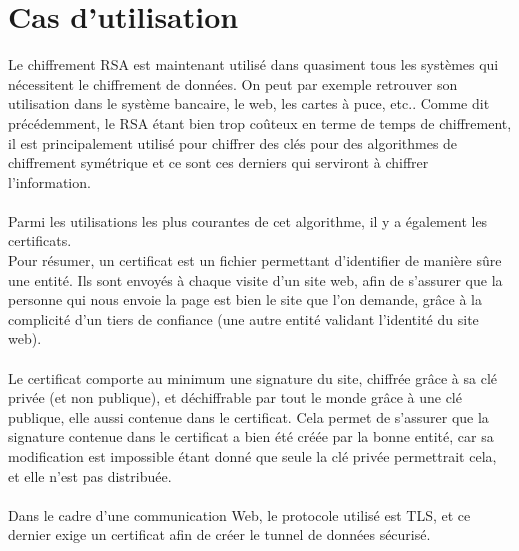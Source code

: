 	\section{Cas d'utilisation}
		Le chiffrement RSA est maintenant utilisé dans quasiment tous les systèmes qui nécessitent le chiffrement de données. On peut par exemple retrouver son utilisation dans le système bancaire, le web, les cartes à puce, etc..
		Comme dit précédemment, le RSA étant bien trop coûteux en terme de temps de chiffrement, il est principalement utilisé pour chiffrer des clés pour des algorithmes de chiffrement symétrique et ce sont ces derniers qui serviront à chiffrer l'information.\\
		\\
		Parmi les utilisations les plus courantes de cet algorithme, il y a également les certificats.\\
		Pour résumer, un certificat est un fichier permettant d'identifier de manière sûre une entité. Ils sont envoyés à chaque visite d'un site web, afin de s'assurer que la personne qui nous envoie la page est bien le site que l'on demande, grâce à la complicité d'un tiers de confiance (une autre entité validant l'identité du site web).\\
		\\
		Le certificat comporte au minimum une signature du site, chiffrée grâce à sa clé privée (et non publique), et déchiffrable par tout le monde grâce à une clé publique, elle aussi contenue dans le certificat. Cela permet de s'assurer que la signature contenue dans le certificat a bien été créée par la bonne entité, car sa modification est impossible étant donné que seule la clé privée permettrait cela, et elle n'est pas distribuée.\\
		\\
		Dans le cadre d'une communication Web, le protocole utilisé est TLS, et ce dernier exige un certificat afin de créer le tunnel de données sécurisé.